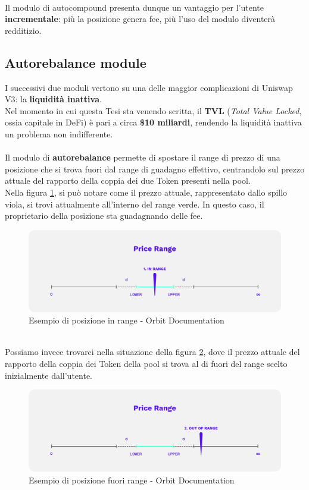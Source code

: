\documentclass[12pt,a4paper]{report}
\begin{document}
\noindent \\Il modulo di autocompound presenta dunque un vantaggio per l'utente \textbf{incrementale}: più la posizione genera fee, più l'uso del modulo diventerà redditizio.
\subsection{Autorebalance module}

I successivi due moduli vertono su una delle maggior complicazioni di Uniswap V3: la \textbf{liquidità inattiva}.
\\Nel momento in cui questa Tesi sta venendo scritta, il \textbf{TVL} (\textit{Total Value Locked}, ossia capitale in DeFi) è pari a circa \textbf{\$10 miliardi}, rendendo la liquidità inattiva un problema non indifferente.\\
\\Il modulo di \textbf{autorebalance} permette di spostare il range di prezzo di una posizione che si trova fuori dal range di guadagno effettivo, centrandolo sul prezzo attuale del rapporto della coppia dei due Token presenti nella pool.
\\Nella figura \ref{fig:in_range}, si può notare come il prezzo attuale, rappresentato dallo spillo viola, si trovi attualmente all'interno del range verde. In questo caso, il proprietario della posizione sta guadagnando delle fee.


\begin{figure}[H]
  \includegraphics[scale=0.3]{in_range.png}
  \centering
  \caption{Esempio di posizione in range - Orbit Documentation}
  \label{fig:in_range}
\end{figure}

\noindent \\Possiamo invece trovarci nella situazione della figura \ref{fig:oor}, dove il prezzo attuale del rapporto della coppia dei Token della pool si trova al di fuori del range scelto inizialmente dall'utente.\\

\begin{figure}[H]
  \includegraphics[scale=0.3]{oor.png}
  \centering
  \caption{Esempio di posizione fuori range - Orbit Documentation}
  \label{fig:oor}
\end{figure}
\end{document}
